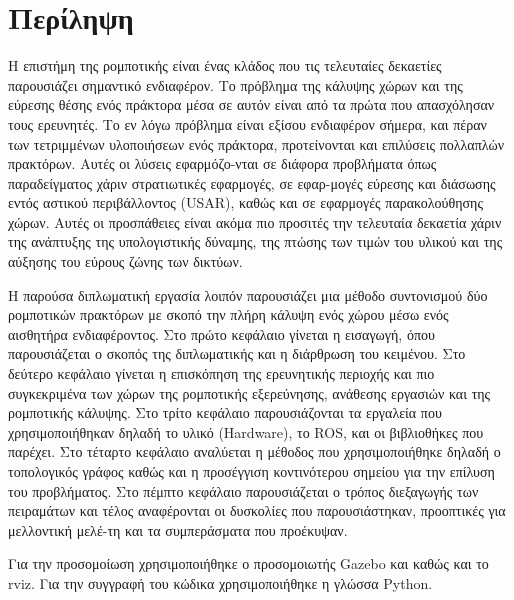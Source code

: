 \section*{Περίληψη}

Η επιστήμη της ρομποτικής είναι ένας κλάδος που τις τελευταίες δεκαετίες παρουσιάζει σημαντικό ενδιαφέρον. Το πρόβλημα της κάλυψης χώρων και της εύρεσης θέσης ενός πράκτορα μέσα σε αυτόν είναι από τα πρώτα που απασχόλησαν τους ερευνητές. Το εν λόγω πρόβλημα είναι εξίσου ενδιαφέρον σήμερα, και πέραν των τετριμμένων υλοποιήσεων ενός πράκτορα, προτείνονται και επιλύσεις πολλαπλών πρακτόρων. Αυτές οι λύσεις εφαρμόζο-νται σε διάφορα προβλήματα όπως παραδείγματος χάριν στρατιωτικές εφαρμογές, σε εφαρ-μογές εύρεσης και διάσωσης εντός αστικού περιβάλλοντος (USAR), καθώς και σε εφαρμογές παρακολούθησης χώρων. Αυτές οι προσπάθειες είναι ακόμα πιο προσιτές την τελευταία δεκαετία χάριν της ανάπτυξης της υπολογιστικής δύναμης, της πτώσης των τιμών του υλικού και της αύξησης του εύρους ζώνης των δικτύων.

Η παρούσα διπλωματική εργασία λοιπόν παρουσιάζει μια μέθοδο συντονισμού δύο ρομποτικών πρακτόρων με σκοπό την πλήρη κάλυψη ενός χώρου μέσω ενός αισθητήρα ενδιαφέροντος. Στο πρώτο κεφάλαιο γίνεται η εισαγωγή, όπου παρουσιάζεται ο σκοπός της διπλωματικής και η διάρθρωση του κειμένου. Στο δεύτερο κεφάλαιο γίνεται η επισκόπηση της ερευνητικής περιοχής και πιο συγκεκριμένα των χώρων της ρομποτικής εξερεύνησης, ανάθεσης εργασιών και της ρομποτικής κάλυψης. Στο τρίτο κεφάλαιο παρουσιάζονται τα εργαλεία που χρησιμοποιήθηκαν δηλαδή το υλικό (Hardware), το ROS, και οι βιβλιοθήκες που παρέχει. Στο τέταρτο κεφάλαιο αναλύεται η μέθοδος που χρησιμοποιήθηκε δηλαδή ο τοπολογικός γράφος καθώς και η προσέγγιση κοντινότερου σημείου για την επίλυση του προβλήματος. Στο πέμπτο κεφάλαιο παρουσιάζεται ο τρόπος διεξαγωγής των πειραμάτων και τέλος αναφέρονται οι δυσκολίες που παρουσιάστηκαν, προοπτικές για μελλοντική μελέ-τη και τα συμπεράσματα που προέκυψαν. 

Για την προσομοίωση χρησιμοποιήθηκε ο προσομοιωτής Gazebo και καθώς και το rviz. Για την συγγραφή του κώδικα χρησιμοποιήθηκε η γλώσσα Python. 


